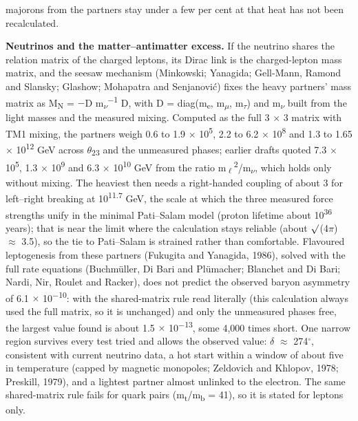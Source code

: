 \documentclass[
  11pt,
]{article}
\begin{document}
majorons from the partners stay under a few per cent at that heat has not been recalculated.

\textbf{Neutrinos and the matter--antimatter excess.} If the neutrino shares the relation matrix of the charged leptons, its Dirac link is the charged-lepton mass matrix, and the seesaw mechanism (Minkowski; Yanagida; Gell-Mann, Ramond and Slansky; Glashow; Mohapatra and Senjanović) fixes the heavy partners' mass matrix as M\textsubscript{N} = \ensuremath{-}D m\textsubscript{\ensuremath{\nu}}\textsuperscript{\ensuremath{-}1} D, with D = diag(m\textsubscript{e}, m\textsubscript{\ensuremath{\mu}}, m\textsubscript{\ensuremath{\tau}}) and m\textsubscript{\ensuremath{\nu}} built from the light masses and the measured mixing. Computed as the full 3 \ensuremath{\times} 3 matrix with TM1 mixing, the partners weigh 0.6 to 1.9 \ensuremath{\times} 10\textsuperscript{5}, 2.2 to 6.2 \ensuremath{\times} 10\textsuperscript{8} and 1.3 to 1.65 \ensuremath{\times} 10\textsuperscript{12} GeV across \ensuremath{\theta}\textsubscript{23} and the unmeasured phases; earlier drafts quoted 7.3 \ensuremath{\times} 10\textsuperscript{5}, 1.3 \ensuremath{\times} 10\textsuperscript{9} and 6.3 \ensuremath{\times} 10\textsuperscript{10} GeV from the ratio m\textsubscript{\ensuremath{\ell}}\textsuperscript{2}/m\textsubscript{\ensuremath{\nu}}, which holds only without mixing. The heaviest then needs a right-handed coupling of about 3 for left--right breaking at 10\textsuperscript{11.7} GeV, the scale at which the three measured force strengths unify in the minimal Pati--Salam model (proton lifetime about 10\textsuperscript{36} years); that is near the limit where the calculation stays reliable (about \ensuremath{\surd}(4\ensuremath{\pi}) \ensuremath{\approx} 3.5), so the tie to Pati--Salam is strained rather than comfortable. Flavoured leptogenesis from these partners (Fukugita and Yanagida, 1986), solved with the full rate equations (Buchmüller, Di Bari and Plümacher; Blanchet and Di Bari; Nardi, Nir, Roulet and Racker), does not predict the observed baryon asymmetry of 6.1 \ensuremath{\times} 10\textsuperscript{\ensuremath{-}10}: with the shared-matrix rule read literally (this calculation always used the full matrix, so it is unchanged) and only the unmeasured phases free, the largest value found is about 1.5 \ensuremath{\times} 10\textsuperscript{\ensuremath{-}13}, some 4,000 times short. One narrow region survives every test tried and allows the observed value: \ensuremath{\delta} \ensuremath{\approx} 274\ensuremath{^\circ}, consistent with current neutrino data, a hot start within a window of about five in temperature (capped by magnetic monopoles; Zeldovich and Khlopov, 1978; Preskill, 1979), and a lightest partner almost unlinked to the electron. The same shared-matrix rule fails for quark pairs (m\textsubscript{t}/m\textsubscript{b} = 41), so it is stated for leptons only.
\end{document}
